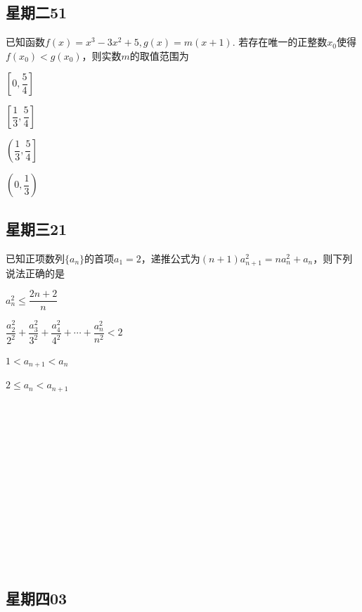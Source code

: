\documentclass[UTF8,a4paper,11 pt]{ctexart}%
\begin{document}
	\subsection{星期二51}\noindent
	已知函数$ f(x)=x^3-3x^2+5,g(x)=m(x+1) $. 若存在唯一的正整数$ x_0 $使得$ f(x_0)<g(x_0) $，则实数$ m $的取值范围为\begin{xchoices}[label-style=Alph]
		\item $ \left[0,\dfrac{5}{4}\right] $
		\item $ \left[\dfrac{1}{3},\dfrac{5}{4}\right] $
		\item $ \left(\dfrac{1}{3},\dfrac{5}{4}\right] $
		\item $ \left(0,\dfrac{1}{3}\right) $
	\end{xchoices}
	\clearpage\subsection{星期三21}\noindent
	已知正项数列$ \{a_n\} $的首项$ a_1=2 $，递推公式为$ (n+1)a_{n+1}^2=na_n^2+a_n $，则下列说法正确的是
	\begin{xchoices}[label-style=Alph]
		\item $ a_n^2\le\dfrac{2n+2}{n} $
		\item $ \dfrac{a_2^2}{2^2}+\dfrac{a_3^2}{3^2}+\dfrac{a_4^2}{4^2}+\cdots+\dfrac{a_n^2}{n^2}<2 $
		\item $ 1<a_{n+1}<a_n$
		\item $ 2\le a_{n}<a_{n+1} $
	\end{xchoices}
	\\\,\\\,\\\,\\\,\\\,\\\,\\\,\\\,\\\,\\\,\\\,
	\subsection{星期四03}
\end{document}
